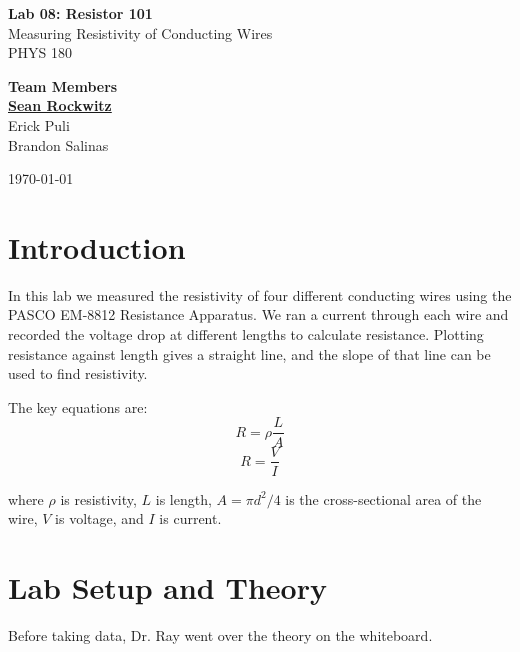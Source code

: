 \documentclass[12pt]{article}
\begin{document}
\begin{titlepage}
    \centering
    \vspace*{3cm}

    {\LARGE \textbf{Lab 08: Resistor 101}}\\[0.6em]
    {\large Measuring Resistivity of Conducting Wires}\\[0.4em]
    {\large PHYS 180}

    \vspace{2.5cm}

    {\large \textbf{Team Members}}\\[0.8em]
    {\large \underline{\textbf{Sean Rockwitz}}}\\[0.4em]
    {\large Erick Puli}\\[0.4em]
    {\large Brandon Salinas}

    \vspace{2.5cm}

    {\large \today}

    \vfill
\end{titlepage}

\section*{Introduction}

In this lab we measured the resistivity of four different conducting wires using the PASCO EM-8812 Resistance Apparatus. We ran a current through each wire and recorded the voltage drop at different lengths to calculate resistance. Plotting resistance against length gives a straight line, and the slope of that line can be used to find resistivity.

The key equations are:
\begin{equation}
    R = \rho \frac{L}{A}
    \label{eq:resistivity}
\end{equation}
\begin{equation}
    R = \frac{V}{I}
    \label{eq:ohm}
\end{equation}

where $\rho$ is resistivity, $L$ is length, $A = \pi d^2/4$ is the cross-sectional area of the wire, $V$ is voltage, and $I$ is current.

\section*{Lab Setup and Theory}

Before taking data, Dr. Ray went over the theory on the whiteboard.
\end{document}
